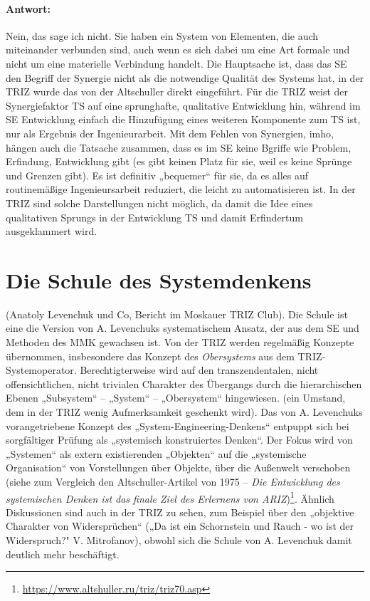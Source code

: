 \documentclass[11pt,a4paper]{article}
\begin{document}
\paragraph{Antwort:}
Nein, das sage ich nicht. Sie haben ein System von Elementen, die auch
miteinander verbunden sind, auch wenn es sich dabei um eine Art formale und
nicht um eine materielle Verbindung handelt.  Die Hauptsache ist, dass das SE
den Begriff der Synergie nicht als die notwendige Qualität des Systems hat, in
der TRIZ wurde das von der Altschuller direkt eingeführt. Für die TRIZ weist
der Synergiefaktor TS auf eine sprunghafte, qualitative Entwicklung hin,
während im SE Entwicklung einfach die Hinzufügung eines weiteren Komponente
zum TS ist, nur als Ergebnis der Ingenieurarbeit. Mit dem Fehlen von
Synergien, imho, hängen auch die Tatsache zusammen, dass es im SE keine
Bgriffe wie Problem, Erfindung, Entwicklung gibt (es gibt keinen Platz für
sie, weil es keine Sprünge und Grenzen gibt).  Es ist definitiv „bequemer“ für
sie, da es alles auf routinemäßige Ingenieursarbeit reduziert, die leicht zu
automatisieren ist. In der TRIZ sind solche Darstellungen nicht möglich, da
damit die Idee eines qualitativen Sprungs in der Entwicklung TS und damit
Erfindertum ausgeklammert wird.

\section{Die Schule des Systemdenkens}
(Anatoly Levenchuk und Co, Bericht im Moskauer TRIZ Club). Die Schule ist eine
die Version von A. Levenchuks systematischem Ansatz, der aus dem SE und
Methoden des MMK gewachsen ist. Von der TRIZ werden regelmäßig Konzepte
übernommen, insbesondere das Konzept des \emph{Obersystems} aus dem
TRIZ-Systemoperator. Berechtigterweise wird auf den transzendentalen, nicht
offensichtlichen, nicht trivialen Charakter des Übergangs durch die
hierarchischen Ebenen „Subsystem“ -- „System“ -- „Obersystem“ hingewiesen.
(ein Umstand, dem in der TRIZ wenig Aufmerksamkeit geschenkt wird).  Das von
A. Levenchuks vorangetriebene Konzept des „System-Engineering-Denkens“
entpuppt sich bei sorgfältiger Prüfung als „systemisch konstruiertes Denken“.
Der Fokus wird von „Systemen“ als extern existierenden „Objekten“ auf die
„systemische Organisation“ von Vorstellungen über Objekte, über die Außenwelt
verschoben (siehe zum Vergleich den Altschuller-Artikel von 1975 -- \emph{Die
  Entwicklung des systemischen Denken ist das finale Ziel des Erlernens von
  ARIZ})\footnote{\url{https://www.altshuller.ru/triz/triz70.asp}}. Ähnlich
Diskussionen sind auch in der TRIZ zu sehen, zum Beispiel über den „objektive
Charakter von Widersprüchen“ („Da ist ein Schornstein und Rauch - wo ist der
Widerspruch?"  V. Mitrofanov), obwohl sich die Schule von A. Levenchuk damit
deutlich mehr beschäftigt.
\end{document}
